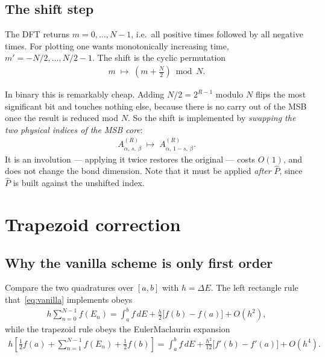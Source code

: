 \documentclass{article}
\begin{document}
	\subsection{The shift step}\label{sec:shift}
	
	The DFT returns $m = 0,\dots,N-1$, i.e.\ all positive times followed by all
	negative times. For plotting one wants monotonically increasing time,
	$m' = -N/2,\dots,N/2-1$. The shift is the cyclic permutation
	\begin{align}
		m \;\longmapsto\; \left(m + \tfrac{N}{2}\right) \bmod N.
	\end{align}
	
	In binary this is remarkably cheap. Adding $N/2 = 2^{R-1}$ modulo $N$ flips the
	most significant bit and touches nothing else, because there is no carry out of
	the MSB once the result is reduced mod $N$. So the shift is implemented by
	\emph{swapping the two physical indices of the MSB core}:
	\begin{align}
		A^{(R)}_{\alpha,\,s,\,\beta} \;\longmapsto\; A^{(R)}_{\alpha,\,1-s,\,\beta}.
	\end{align}
	It is an involution --- applying it twice restores the original --- costs
	$O(1)$, and does not change the bond dimension. Note that it must be applied
	\emph{after} $\hat{P}$, since $\hat{P}$ is built against the unshifted index.
	
	\section{Trapezoid correction}\label{sec:trapez}
	
	\subsection{Why the vanilla scheme is only first order}
	
	Compare the two quadratures over $[a,b]$ with $h = \Delta E$. The left rectangle
	rule that~\eqref{eq:vanilla} implements obeys
	\begin{align}
		h\sum_{n=0}^{N-1} f(E_n) = \int_a^b f\,dE
		+ \frac{h}{2}\big[f(b) - f(a)\big] + O(h^2),
		\label{eq:rect}
	\end{align}
	while the trapezoid rule obeys the Euler\textendash{}Maclaurin expansion
	\begin{align}
		h\left[\tfrac12 f(a) + \sum_{n=1}^{N-1} f(E_n) + \tfrac12 f(b)\right]
		= \int_a^b f\,dE + \frac{h^2}{12}\big[f'(b) - f'(a)\big] + O(h^4).
		\label{eq:em}
	\end{align}
	
\end{document}
